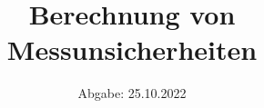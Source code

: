 

\subject{Übung 2}
\title{Berechnung von Messunsicherheiten}
\date{
  Abgabe: 25.10.2022
}



\maketitle
\thispagestyle{empty}
\tableofcontents
\newpage



%
%

\printbibliography{}


